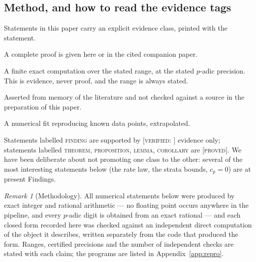 \documentclass[11pt,reqno]{article}
\newcommand{\PROVED}{{\normalfont\textsc{[proved]}}}
\newcommand{\VER}[1]{{\normalfont\textsc{[verified:} #1\textsc{]}}}
\newcommand{\RECALLED}{{\normalfont\textsc{[recalled--unverified]}}}
\newcommand{\FIT}{{\normalfont\textsc{[conjectural fit]}}}
\theoremstyle{plain}
\theoremstyle{definition}
\theoremstyle{remark}
\newtheorem{remark}[theorem]{Remark}
\numberwithin{equation}{section}
\begin{document}
\subsection{Method, and how to read the evidence tags}\label{ss:evidence}

Statements in this paper carry an explicit evidence class, printed with the
statement.

\begin{description}[leftmargin=2.2em,style=nextline]
\item[\PROVED] A complete proof is given here or in the cited companion paper.
\item[\VER{range}] A finite exact computation over the stated range, at the
  stated $p$-adic precision.  This is evidence, never proof, and the range is
  always stated.
\item[\RECALLED] Asserted from memory of the literature and not checked against
  a source in the preparation of this paper.
\item[\FIT] A numerical fit reproducing known data points, extrapolated.
\end{description}

Statements labelled \textsc{finding} are supported by \VER{} evidence only;
statements labelled \textsc{theorem}, \textsc{proposition}, \textsc{lemma},
\textsc{corollary} are \PROVED.  We have been deliberate about not promoting one
class to the other: several of the most interesting statements below (the rate
law, the strata bounds, $c_p=0$) are at present Findings.

\begin{remark}[Methodology]\label{rem:method}
All numerical statements below were produced by exact integer and rational
arithmetic --- no floating point occurs anywhere in the pipeline, and every
$p$-adic digit is obtained from an exact rational --- and each closed form
recorded here was checked against an independent direct computation of the
object it describes, written separately from the code that produced the form.
Ranges, certified precisions and the number of independent checks are stated
with each claim; the programs are listed in Appendix~\ref{app:repro}.
\end{remark}
\end{document}
